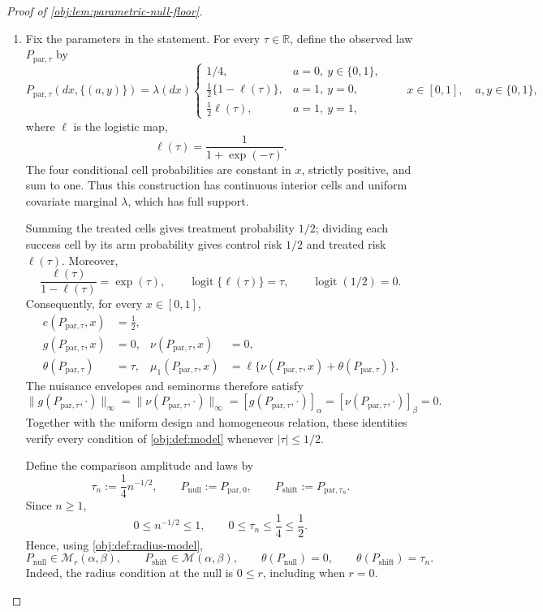 \begin{proof}[Proof of \cref{obj:lem:parametric-null-floor}]
\begin{enumerate}
\item Fix the parameters in the statement. For every \(\tau\in\mathbb R\), define the observed law \(P_{\mathrm{par},\tau}\) by
\[
P_{\mathrm{par},\tau}(dx,\{(a,y)\})
=
\lambda(dx)
\begin{cases}
1/4,&a=0,\ y\in\{0,1\},\\
\frac12\{1-\ell(\tau)\},&a=1,\ y=0,\\
\frac12\ell(\tau),&a=1,\ y=1,
\end{cases}
\qquad
x\in[0,1],\quad a,y\in\{0,1\},
\]
where \(\ell\) is the logistic map,
\[
\ell(\tau)=\frac{1}{1+\exp(-\tau)}.
\]
The four conditional cell probabilities are constant in \(x\), strictly positive, and sum to one. Thus this construction has continuous interior cells and uniform covariate marginal \(\lambda\), which has full support.

Summing the treated cells gives treatment probability \(1/2\); dividing each success cell by its arm probability gives control risk \(1/2\) and treated risk \(\ell(\tau)\). Moreover,
\[
\frac{\ell(\tau)}{1-\ell(\tau)}=\exp(\tau),
\qquad
\operatorname{logit}\{\ell(\tau)\}=\tau,
\qquad
\operatorname{logit}(1/2)=0.
\]
Consequently, for every \(x\in[0,1]\),
\[
\begin{aligned}
e(P_{\mathrm{par},\tau},x)&=\frac12,\\
g(P_{\mathrm{par},\tau},x)&=0,
&
\nu(P_{\mathrm{par},\tau},x)&=0,\\
\theta(P_{\mathrm{par},\tau})&=\tau,
&
\mu_1(P_{\mathrm{par},\tau},x)
&=\ell\{\nu(P_{\mathrm{par},\tau},x)+\theta(P_{\mathrm{par},\tau})\}.
\end{aligned}
\]
The nuisance envelopes and seminorms therefore satisfy
\[
\|g(P_{\mathrm{par},\tau},\cdot)\|_\infty
=
\|\nu(P_{\mathrm{par},\tau},\cdot)\|_\infty
=
[g(P_{\mathrm{par},\tau},\cdot)]_\alpha
=
[\nu(P_{\mathrm{par},\tau},\cdot)]_\beta
=0.
\]
Together with the uniform design and homogeneous relation, these identities verify every condition of \cref{obj:def:model} whenever \(|\tau|\le1/2\).

Define the comparison amplitude and laws by
\[
\tau_n:=\frac14 n^{-1/2},
\qquad
P_{\mathrm{null}}:=P_{\mathrm{par},0},
\qquad
P_{\mathrm{shift}}:=P_{\mathrm{par},\tau_n}.
\]
Since \(n\ge1\),
\[
0\le n^{-1/2}\le1,
\qquad
0\le\tau_n\le\frac14\le\frac12.
\]
Hence, using \cref{obj:def:radius-model},
\[
P_{\mathrm{null}}\in\mathcal M_r(\alpha,\beta),
\qquad
P_{\mathrm{shift}}\in\mathcal M(\alpha,\beta),
\qquad
\theta(P_{\mathrm{null}})=0,
\qquad
\theta(P_{\mathrm{shift}})=\tau_n.
\]
Indeed, the radius condition at the null is \(0\le r\), including when \(r=0\).


\end{enumerate}
\end{proof}
